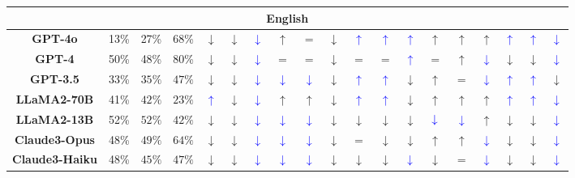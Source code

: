 \documentclass{article}
\newcommand{\bluearrow}[1]{\textcolor{blue}{#1}}
\begin{document}
\begin{table}[!ht]
{\begin{tabular}{c|cc|c|ccc|ccc|ccc|ccc|ccc}
\multicolumn{19}{c}{\textbf{English}} \\ \hline

\textbf{GPT-4o}  & 13\% & 27\%  & 68\% & $\downarrow$ & $\downarrow$ & \bluearrow{$\downarrow$} & $\uparrow$ & $=$ & $\downarrow$ & \bluearrow{$\uparrow$} & \bluearrow{$\uparrow$} & \bluearrow{$\uparrow$} & $\uparrow$ & $\uparrow$  & $\uparrow$ & \bluearrow{$\uparrow$} & \bluearrow{$\uparrow$} & \bluearrow{$\downarrow$} \\ 
\textbf{GPT-4}  & 50\% & 48\%  & 80\% & $\downarrow$ & $\downarrow$ & \bluearrow{$\downarrow$} & $=$ & $=$ & $\downarrow$ & $=$ & $=$ & \bluearrow{$\uparrow$} & $=$ & $\uparrow$  & \bluearrow{$\downarrow$} & $\downarrow$ & $\downarrow$ & \bluearrow{$\downarrow$} \\ 
\textbf{GPT-3.5} & 33\% & $35\%$ & $47\%$ & $\downarrow$ & $\downarrow$ & \bluearrow{$\downarrow$} & \bluearrow{$\downarrow$} & \bluearrow{$\downarrow$} & $\downarrow$ & \bluearrow{$\uparrow$} & \bluearrow{$\uparrow$} & $\downarrow$ & $\uparrow$ & $=$ & \bluearrow{$\downarrow$} & \bluearrow{$\uparrow$} & \bluearrow{$\uparrow$} & $\downarrow  $\\
\hline
\textbf{LLaMA2-70B} & 41\% & $42\%$ & $23\%$ & \bluearrow{$\uparrow$} & $\downarrow$ & \bluearrow{$\downarrow$} & $\uparrow$ & $\uparrow$ & $\downarrow$ & \bluearrow{$\uparrow$} & \bluearrow{$\uparrow$} & $\downarrow$ & $\uparrow$ & $\uparrow$ & $\uparrow$ & \bluearrow{$\uparrow$} & \bluearrow{$\uparrow$} & \bluearrow{$\downarrow $}\\
\textbf{LLaMA2-13B} & 52\% & $52\%$ & $42\%$ & $\downarrow$ & $\downarrow$ & \bluearrow{$\downarrow$} & \bluearrow{$\downarrow$} & \bluearrow{$\downarrow$} & $\downarrow$ & $\downarrow$ & $\downarrow$ & $\downarrow$ & $\bluearrow{\downarrow}$ & \bluearrow{$\downarrow$} & $\uparrow$ & $\downarrow$ & $\downarrow$ & \bluearrow{$\downarrow $}\\
\hline
\textbf{Claude3-Opus} & 48\% & $49\%$ & $64\%$ & $\downarrow$ & $\downarrow$ & \bluearrow{$\downarrow$} & \bluearrow{$\downarrow$} & \bluearrow{$\downarrow$} & $\downarrow$ & $=$ & $\downarrow$ & $\downarrow$ & $\uparrow$ & $\uparrow$ & \bluearrow{$\downarrow$} & $\downarrow$ & $\downarrow$ & \bluearrow{$\downarrow $}\\
\textbf{Claude3-Haiku} & 48\% & $45\%$ & $47\%$ & $\downarrow$ & $\downarrow$ & \bluearrow{$\downarrow$} & \bluearrow{$\downarrow$} & \bluearrow{$\downarrow$} & $\downarrow$ & $\downarrow$ & $\downarrow$ & $\bluearrow{\downarrow}$ & $\downarrow$ & $=$ & \bluearrow{$\downarrow$} & $\downarrow$ & $\downarrow$ & \bluearrow{$\downarrow $}\\

\end{tabular}}
\end{table}
\end{document}
